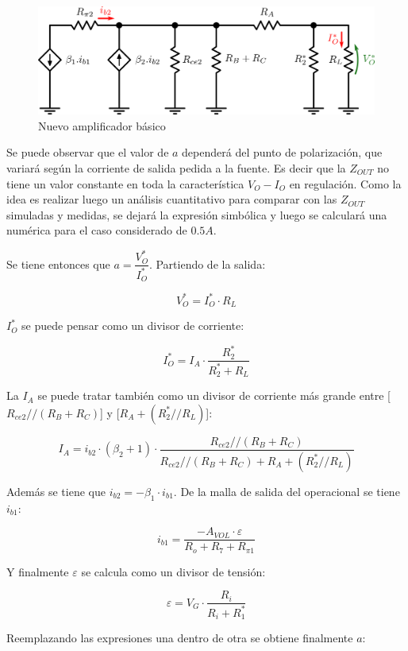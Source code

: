 \begin{figure}[!ht]
\begin{centering}
\includegraphics[scale=0.5]{Imagenes/NuevoAmpBasicoCancer_Parte2.png}
\par\end{centering}
\caption{Nuevo amplificador b\'asico}

\end{figure}

Se puede observar que el valor de $a$ depender\'a del punto de polarizaci\'on, que variar\'a seg\'un la corriente de salida pedida a la fuente. Es decir que la $Z_{OUT}$ no tiene un valor constante en toda la caracter\'istica $V_O - I_O$ en regulaci\'on. Como la idea es realizar luego un an\'alisis cuantitativo para comparar con las $Z_{OUT}$ simuladas y medidas, se dejar\'a la expresi\'on simb\'olica y luego se calcular\'a una num\'erica para el caso considerado de $0.5A$.

Se tiene entonces que $a = \dfrac{V^*_O}{I^*_O}$. Partiendo de la salida:

\[
V^*_O = I^*_O \cdot R_L
\]

$I^*_O$ se puede pensar como un divisor de corriente:

\[
I^*_O = I_A \cdot \frac{R^*_2}{R^*_2 + R_L} 
\]

La $I_A$ se puede tratar tambi\'en como un divisor de corriente m\'as grande entre [$R_{ce2}//(R_B+R_C)$] y [$R_A + (R^*_2 // R_L)$]:

\[
I_A = i_{b2} \cdot (\beta_2+1) \cdot \frac{R_{ce2}//(R_B+R_C)}{R_{ce2}//(R_B+R_C) + R_A + (R^*_2 // R_L)}
\]

Adem\'as se tiene que $i_{b2} = -\beta_1 \cdot i_{b1}$. De la malla de salida del operacional se tiene $i_{b1}$:

\[
i_{b1} = \frac{-A_{VOL} \cdot \varepsilon}{R_o + R_7 + R_{\pi1}}
\]

Y finalmente $\varepsilon$ se calcula como un divisor de tensi\'on:

\[
\varepsilon = V_G \cdot \frac{R_i}{R_i + R^*_1}
\]

Reemplazando las expresiones una dentro de otra se obtiene finalmente $a$:

